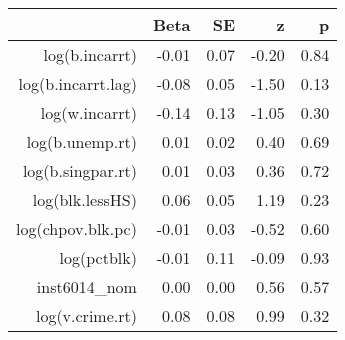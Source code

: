 \begin{table}[ht]
\centering
\begin{tabular}{rrrrr}
  \hline
 & Beta & SE & z & p \\ 
  \hline
log(b.incarrt) & -0.01 & 0.07 & -0.20 & 0.84 \\ 
  log(b.incarrt.lag) & -0.08 & 0.05 & -1.50 & 0.13 \\ 
  log(w.incarrt) & -0.14 & 0.13 & -1.05 & 0.30 \\ 
  log(b.unemp.rt) & 0.01 & 0.02 & 0.40 & 0.69 \\ 
  log(b.singpar.rt) & 0.01 & 0.03 & 0.36 & 0.72 \\ 
  log(blk.lessHS) & 0.06 & 0.05 & 1.19 & 0.23 \\ 
  log(chpov.blk.pc) & -0.01 & 0.03 & -0.52 & 0.60 \\ 
  log(pctblk) & -0.01 & 0.11 & -0.09 & 0.93 \\ 
  inst6014\_nom & 0.00 & 0.00 & 0.56 & 0.57 \\ 
  log(v.crime.rt) & 0.08 & 0.08 & 0.99 & 0.32 \\ 
   \hline
\end{tabular}
\end{table}
